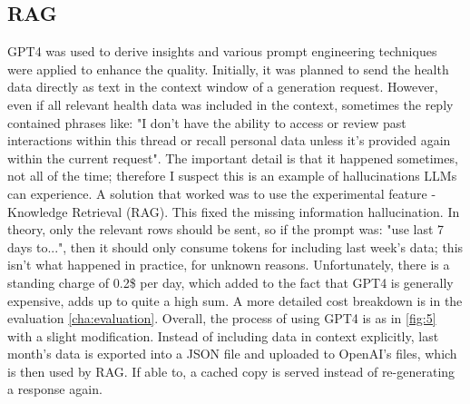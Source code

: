 \subsection{RAG}
GPT4 was used to derive insights and various prompt engineering techniques were applied to enhance the quality. Initially, it was planned to send the health data directly as text in the context window of a generation request. However, even if all relevant health data was included in the context, sometimes the reply contained phrases like: "I don't have the ability to access or review past interactions within this thread or recall personal data unless it's provided again within the current request". The important detail is that it happened sometimes, not all of the time; therefore I suspect this is an example of hallucinations LLMs can experience. A solution that worked was to use the experimental feature - Knowledge Retrieval (RAG). This fixed the missing information hallucination. In theory, only the relevant rows should be sent, so if the prompt was: "use last 7 days to...", then it should only consume tokens for including last week's data; this isn't what happened in practice, for unknown reasons.  Unfortunately, there is a standing charge of 0.2\$ per day, which added to the fact that GPT4 is generally expensive, adds up to quite a high sum. A more detailed cost breakdown is in the evaluation \ref{cha:evaluation}. Overall, the process of using GPT4 is as in \ref{fig:5} with a slight modification. Instead of including data in context explicitly, last month's data is exported into a JSON file and uploaded to OpenAI's files, which is then used by RAG. If able to, a cached copy is served instead of re-generating a response again.

